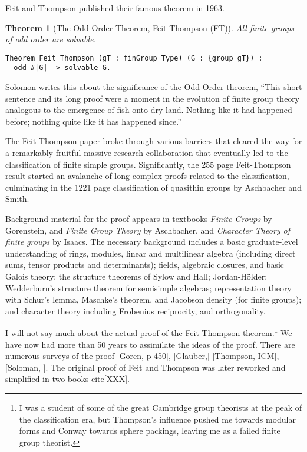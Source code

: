 \documentclass[brochure,english,12pt]{bourbaki}
\theoremstyle{plain}
\newtheorem{theorem}[equation]{Theorem}
\begin{document}
Feit and Thompson published their famous theorem in 1963.

\begin{theorem}[The Odd Order Theorem, Feit-Thompson (FT)]  All finite groups of odd order are solvable.
\end{theorem}

\begin{lstlisting}[keepspaces=true,stringstyle=\tt,basicstyle=\small,frame=single,framesep=8pt,mathescape,morekeywords={Theorem},columns=flexible]
Theorem Feit_Thompson (gT : finGroup Type) (G : {group gT}) :
  odd #|G| -> solvable G.
\end{lstlisting}

Solomon writes this about the significance of the Odd Order theorem, ``This short sentence and its long proof
were a moment in the evolution of finite group theory analogous to the emergence of fish onto dry
land.  Nothing like it had happened before; nothing quite like it has happened since.''

The Feit-Thompson paper broke through various barriers that cleared the way for a 
remarkably fruitful massive research collaboration that eventually led to the classification
of finite simple groups.  Significantly, the  255 page Feit-Thompson result
started an avalanche of long complex proofs related to the classification, 
culminating in the 1221 page classification of quasithin groups by Aschbacher and Smith.


Background material for the proof appears in
textbooks {\it Finite Groups} by Gorenstein, and {\it Finite  Group Theory} by Aschbacher, and 
{\it Character Theory of finite groups} by Isaacs.
The necessary background includes a basic graduate-level understanding of rings, modules, linear and multilinear algebra (including 
direct sums, tensor
products  and determinants);
fields, algebraic closures, and basic Galois theory; the structure theorems of Sylow and Hall; Jordan-H\"older;
Wedderburn's structure theorem for semisimple algebras; representation theory with Schur's lemma, Maschke's theorem,
and Jacobson density (for finite groups); and character theory including Frobenius reciprocity, and orthogonality. 

I will not say much about the actual proof of the 
Feit-Thompson theorem.\footnote{I was a student of some of the great Cambridge group theorists at the peak of
the classification era, but Thompson's influence pushed me towards modular forms and Conway towards sphere packings,
leaving me as a failed finite group theorist.}  We have now had
more than 
50 years to assimilate the ideas of the proof.  There are numerous surveys of the proof [Goren, p 450], [Glauber,] [Thompson, ICM],
[Soloman, ].
The original proof of Feit and Thompson was later reworked  and simplified in two books cite[XXX].
\end{document}

